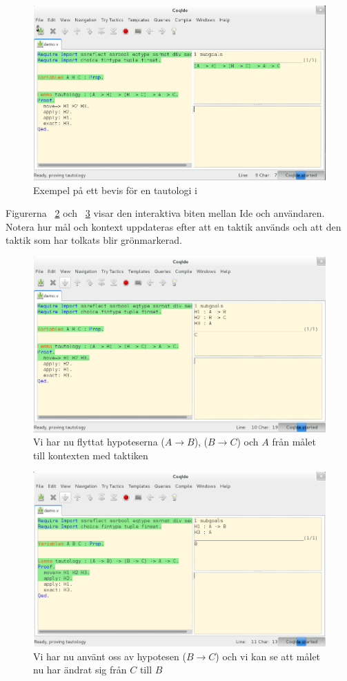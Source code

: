 \begin{figure}[H]
  \centering
  \includegraphics[width=\textwidth]{images/Proof_part1}
  \caption[Exempel på bevis i \coq{}]
   {Exempel på ett bevis för en tautologi i \coq{}}
  \label{fig:bevis1}
\end{figure}

Figurerna ~\ref{fig:bevis2} och ~\ref{fig:bevis3} visar den interaktiva biten
mellan \coq Ide och användaren. Notera hur mål och kontext uppdateras efter att
en taktik används och att den taktik som har tolkats blir grönmarkerad.

\begin{figure}[H]
  \centering
  \includegraphics[width=\textwidth]{images/Proof_part2}
  \caption[Bevis i \coq Ide]
   {Vi har nu flyttat hypoteserna ($A \rightarrow B$), ($B \rightarrow C$) och $A$
    från målet till kontexten med taktiken }
  \label{fig:bevis2}
\end{figure}

\begin{figure}[H]
  \centering
  \includegraphics[width=\textwidth]{images/Proof_part3}
  \caption[Bevis i \coq Ide]
   {Vi har nu använt oss av hypotesen ($B \rightarrow C$) och vi
    kan se att målet nu har ändrat sig från $C$ till $B$}
  \label{fig:bevis3}
\end{figure}

